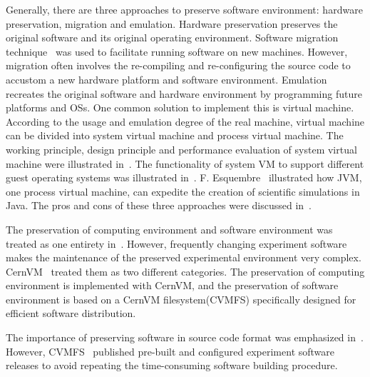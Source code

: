 \documentclass{sig-alternate}
\begin{document}
Generally, there are three approaches to preserve software environment:
hardware preservation, migration and emulation.  Hardware
preservation preserves the original software and its original operating
environment. 
Software migration technique~\cite{cifuentes1996binary,mancl2001refactoring} was used to facilitate running software on new machines.
However, migration often involves the re-compiling and re-configuring
the source code to accustom a new hardware platform and software environment.
Emulation recreates the original software and hardware environment by
programming future platforms and OSs. One common solution to implement this is
virtual machine. According to the usage and emulation degree of the real
machine, virtual machine can be divided into system virtual machine and process
virtual machine. 
The working principle, design principle and
performance evaluation of system virtual machine were illustrated in~\cite{goldberg1974survey, smith2005architecture}. 
The
functionality of system VM to support different guest operating systems was illustrated in~\cite{barham2003xen,kivity2007kvm,rosenblum1999vmware}.
F. Esquembre~\cite{esquembre2004easy} illustrated how JVM, one process virtual machine, can expedite the creation of
scientific simulations in Java. 
The pros and cons of these three approaches were discussed in~\cite{matthews2009towards,phelps2005no,hong2010software}.

The preservation of computing environment and software environment was treated as one entirety in~\cite{matthews2009towards,phelps2005no,hong2010software}. However, frequently changing experiment software makes the maintenance of the preserved experimental environment very complex. 
CernVM~\cite{buncic2010cernvm} treated them as two different categories. The preservation of computing environment is implemented with CernVM, and the preservation of software environment is based on a CernVM filesystem(CVMFS) specifically designed for efficient software distribution.

The importance of preserving software in source code format was emphasized in~\cite{zabolitzky2002preserving,castagne2013consider}. 
However, CVMFS~\cite{buncic2010cernvm} published pre-built and configured experiment software releases to avoid repeating the time-consuming software building procedure. 
\end{document}
